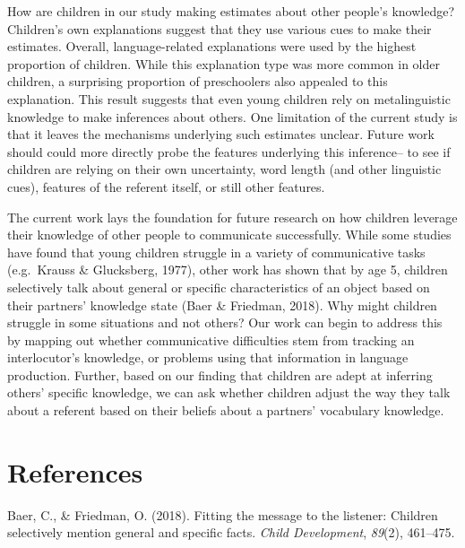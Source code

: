 \documentclass[10pt, letterpaper]{article}
\begin{document}
How are children in our study making estimates about other people's
knowledge? Children's own explanations suggest that they use various
cues to make their estimates. Overall, language-related explanations
were used by the highest proportion of children. While this explanation
type was more common in older children, a surprising proportion of
preschoolers also appealed to this explanation. This result suggests
that even young children rely on metalinguistic knowledge to make
inferences about others. One limitation of the current study is that it
leaves the mechanisms underlying such estimates unclear. Future work
should could more directly probe the features underlying this
inference-- to see if children are relying on their own uncertainty,
word length (and other linguistic cues), features of the referent
itself, or still other features.

The current work lays the foundation for future research on how children
leverage their knowledge of other people to communicate successfully.
While some studies have found that young children struggle in a variety
of communicative tasks (e.g.~Krauss \& Glucksberg, 1977), other work has
shown that by age 5, children selectively talk about general or specific
characteristics of an object based on their partners' knowledge state
(Baer \& Friedman, 2018). Why might children struggle in some situations
and not others? Our work can begin to address this by mapping out
whether communicative difficulties stem from tracking an interlocutor's
knowledge, or problems using that information in language production.
Further, based on our finding that children are adept at inferring
others' specific knowledge, we can ask whether children adjust the way
they talk about a referent based on their beliefs about a partners'
vocabulary knowledge.

\vspace{1em} 

\hypertarget{references}{%
\section{References}\label{references}}

\setlength{\parindent}{-0.1in} 
\setlength{\leftskip}{0.125in}

\noindent

\hypertarget{refs}{}
\leavevmode\hypertarget{ref-baer2018}{}%
Baer, C., \& Friedman, O. (2018). Fitting the message to the listener:
Children selectively mention general and specific facts. \emph{Child
Development}, \emph{89}(2), 461--475.
\end{document}
